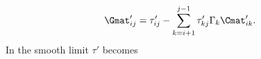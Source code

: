 \begin{equation}
\Gmat'_{ i j} = \tau'_{ i j} -  \sum\limits_{k = i + 1}^{j-1}\tau'_{k j} \Gamma_k\Cmat'_{i k}.
\end{equation}
In the smooth limit $\tau'$ becomes